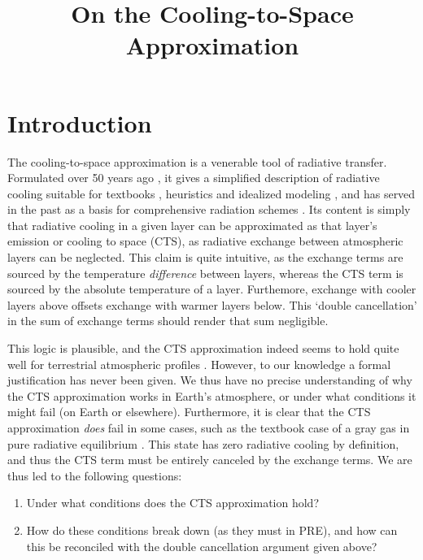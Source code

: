 \documentclass{ametsoc}
\title{On the Cooling-to-Space Approximation}
\affiliation{Princeton University, Princeton, New Jersey}
\begin{document}
\maketitle


%
\section {Introduction}
The cooling-to-space approximation is a venerable tool of radiative transfer. Formulated over 50 years ago \citep{zagoni2016, green1967, rodgers1966}, it gives a simplified description of radiative cooling suitable for textbooks \citep{wallace2006,petty2006,thomas2002}, heuristics and idealized modeling \citep[][]{jeevanjee2019a,jeevanjee2018}, and  has served in the past as a basis for comprehensive radiation schemes  \citep[][]{joseph1976,fels1975,rodgers1966}. Its content is simply that radiative cooling in a given layer can be approximated as that layer's emission or cooling to space (CTS), as radiative exchange between atmospheric layers can be neglected. This claim  is quite intuitive, as  the  exchange terms   are sourced by the temperature \emph{difference} between layers, whereas the CTS term is sourced by the absolute temperature of a layer. Furthemore,   exchange with cooler layers above  offsets  exchange with warmer layers below. This `double cancellation' in the sum of exchange terms should render that sum negligible.

This logic is plausible, and the CTS approximation indeed seems to hold quite well for terrestrial atmospheric profiles \citep[e.g.][as well as Fig. \ref{realgas_decomp_h2o} below]{clough1992,rodgers1966}.  However, to our knowledge a formal justification has never been given. We thus have no precise understanding of why the CTS approximation works in Earth's atmosphere, or under what conditions  it might fail (on Earth or elsewhere). Furthermore, it is clear that the CTS approximation  \emph{does} fail in some cases, such as the textbook case of a gray gas in pure radiative equilibrium \citep[PRE, e.g.][]{pierrehumbert2010}. This state has zero radiative cooling by definition, and thus the CTS term must be entirely canceled by the exchange terms.  We are thus led to the following questions:

\begin{enumerate}
	\item Under what conditions does the CTS approximation  hold? \label{rce_valid}
	\item How do these conditions break down (as they must in PRE), and how can this be reconciled with the double cancellation argument given above?  \label{pre_invalid}
\end{enumerate}
\end{document}
